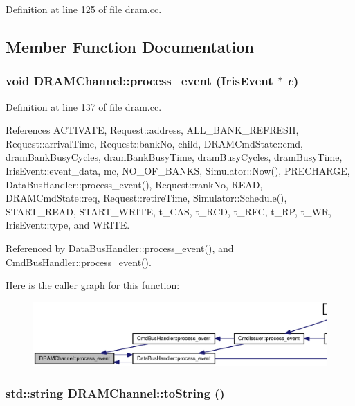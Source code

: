 Definition at line 125 of file dram.cc.

\subsection{Member Function Documentation}
\subsubsection[{process\_\-event}]{\setlength{\rightskip}{0pt plus 5cm}void DRAMChannel::process\_\-event ({\bf IrisEvent} $\ast$ {\em e})}\label{classDRAMChannel_7a3494f58f927c1df099501d5b2daeba}




Definition at line 137 of file dram.cc.

References ACTIVATE, Request::address, ALL\_\-BANK\_\-REFRESH, Request::arrivalTime, Request::bankNo, child, DRAMCmdState::cmd, dramBankBusyCycles, dramBankBusyTime, dramBusyCycles, dramBusyTime, IrisEvent::event\_\-data, mc, NO\_\-OF\_\-BANKS, Simulator::Now(), PRECHARGE, DataBusHandler::process\_\-event(), Request::rankNo, READ, DRAMCmdState::req, Request::retireTime, Simulator::Schedule(), START\_\-READ, START\_\-WRITE, t\_\-CAS, t\_\-RCD, t\_\-RFC, t\_\-RP, t\_\-WR, IrisEvent::type, and WRITE.

Referenced by DataBusHandler::process\_\-event(), and CmdBusHandler::process\_\-event().

Here is the caller graph for this function:\nopagebreak
\begin{figure}[H]
\begin{center}
\leavevmode
\includegraphics[width=420pt]{classDRAMChannel_7a3494f58f927c1df099501d5b2daeba_icgraph}
\end{center}
\end{figure}
\subsubsection[{toString}]{\setlength{\rightskip}{0pt plus 5cm}std::string DRAMChannel::toString ()}\label{classDRAMChannel_12db35357382fc91f7e382fe4a566e75}




